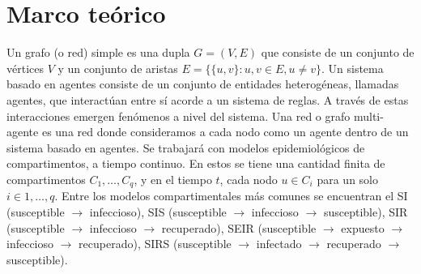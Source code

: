 \chapter{Marco teórico}\label{ch:background}

Un grafo (o red) simple es una dupla $G = (V, E)$ que consiste de un conjunto de vértices $V$ y un conjunto de aristas $E = \{ \{u, v\} : u, v \in E, u \neq v\}$. Un sistema basado en agentes consiste de un conjunto de entidades heterogéneas, llamadas agentes, que interactúan entre sí acorde a un sistema de reglas. A través de estas interacciones emergen fenómenos a nivel del sistema. Una red o grafo multi-agente es una red donde consideramos a cada nodo como un agente dentro de un sistema basado en agentes. 
Se trabajará con modelos epidemiológicos de compartimentos, a tiempo continuo. En estos se tiene una cantidad finita de compartimentos $C_1, \dots, C_q$, y en el tiempo $t$, cada nodo $u \in C_i$ para un solo $i \in 1, \dots, q$. Entre los modelos compartimentales más comunes se encuentran el SI (susceptible $\rightarrow$ infeccioso), SIS (susceptible $\rightarrow$ infeccioso $\rightarrow$ susceptible), SIR (susceptible $\rightarrow$ infeccioso $\rightarrow$ recuperado), SEIR (susceptible $\rightarrow$ expuesto $\rightarrow$ infeccioso $\rightarrow$ recuperado), SIRS (susceptible $\rightarrow$ infectado $\rightarrow$ recuperado $\rightarrow$ susceptible).